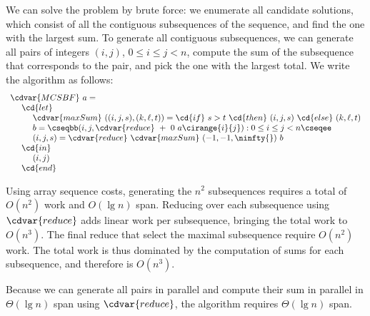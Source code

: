 \begin{cluster}
\label{grp:alg:mcss::bf-alg::mcs}

\begin{algorithm}
\label{alg:mcss::bf-alg::mcs}
We can solve the \MCS{} problem by brute force: we enumerate all
candidate solutions, which consist of all the contiguous subsequences
of the sequence, and find the one with the largest sum.
To generate all contiguous subsequences, we can generate all pairs of
integers $(i,j)$, $0 \le i \le j < n$, compute the sum of the
subsequence that corresponds to the pair, and pick the  one with the
largest total.  We write the algorithm as follows:
\[
\begin{array}{l}
\cdvar{MCSBF}~a =
\\
~~~~\cd{let} 
\\
~~~~~~~~\cdvar{maxSum}~((i, j, s), (k, \ell, t)) = \cd{if}~s > t~\cd{then}~(i, j, s)~\cd{else}~(k, \ell, t) 
\\
~~~~~~~~b = \cseqbb (i, j, \cdvar{reduce}~+~0~a\cirange{i}{j})  : 0  \le i \le j < n \cseqee
\\
~~~~~~~~(i, j, s) = \cdvar{reduce}~\cdvar{maxSum}~(-1, -1, \ninfty{})~b
\\
~~~~\cd{in}
\\
~~~~~~~~(i, j)
\\
~~~~\cd{end}
\end{array}
\]

\end{algorithm}
\end{cluster}

\begin{cluster}
\label{grp:grm:mcss::cost-of-brute-force}

\begin{gram}
\label{grm:mcss::cost-of-brute-force}
Using array sequence costs, generating the $n^2$ subsequences requires
a total of $O(n^2)$ work and $O(\lg{n})$ span.
Reducing over each subsequence using $\cdvar{reduce}$ adds linear work
per subsequence, bringing the total work to $O(n^3)$. 
The final reduce that select the maximal subsequence require $O(n^2)$
work.
The total work is thus dominated by the computation of sums for each
subsequence, and therefore is $O(n^3)$.

Because we can generate all pairs in parallel and compute their sum in
parallel in $\Theta(\lg{n})$ span using $\cdvar{reduce}$, the algorithm
requires $\Theta(\lg{n})$ span.

\end{gram}
\end{cluster}


